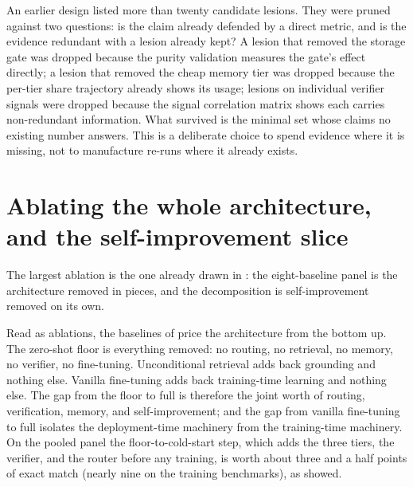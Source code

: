 \begin{bythenumbers}
An earlier design listed more than twenty candidate lesions. They were pruned against
two questions: is the claim already defended by a direct metric, and is the evidence
redundant with a lesion already kept? A lesion that removed the storage gate was
dropped because the purity validation measures the gate's effect directly; a lesion
that removed the cheap memory tier was dropped because the per-tier share trajectory
already shows its usage; lesions on individual verifier signals were dropped because
the signal correlation matrix shows each carries non-redundant information. What
survived is the minimal set whose claims no existing number answers. This is a
deliberate choice to spend evidence where it is missing, not to manufacture re-runs
where it already exists.
\end{bythenumbers}

\section{Ablating the whole architecture, and the self-improvement slice}
\label{sec:abl-architecture}

The largest ablation is the one already drawn in : the eight-baseline
panel is the architecture removed in pieces, and the decomposition is self-improvement
removed on its own.

\begin{precise}
Read as ablations, the baselines of  price the architecture from the
bottom up. The zero-shot floor is everything removed: no routing, no retrieval, no
memory, no verifier, no fine-tuning. Unconditional retrieval adds back grounding and
nothing else. Vanilla fine-tuning adds back training-time learning and nothing else.
The gap from the floor to full \caem{} is therefore the joint worth of routing,
verification, memory, and self-improvement; and the gap from vanilla fine-tuning to
full \caem{} isolates the deployment-time machinery from the training-time machinery. On
the pooled panel the floor-to-cold-start step, which adds the three tiers, the verifier,
and the router before any training, is worth about three and a half points of exact
match (nearly nine on the training benchmarks), as  showed.
\end{precise}

